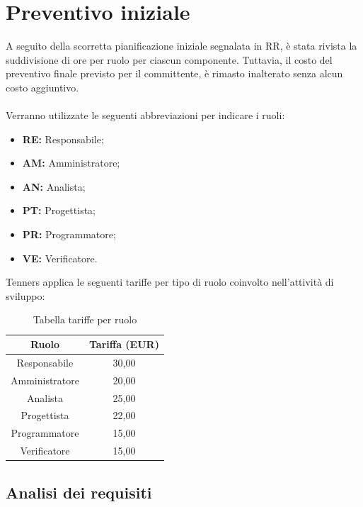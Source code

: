 \section{Preventivo iniziale}
A seguito della scorretta pianificazione iniziale segnalata in RR, è stata rivista la suddivisione di ore per ruolo per ciascun componente. Tuttavia, il costo del preventivo finale previsto per il committente, è rimasto inalterato senza alcun costo aggiuntivo.\\\\
Verranno utilizzate le seguenti abbreviazioni per indicare i ruoli:
\begin{itemize}
	\item \textbf{RE:} Responsabile;
	\item \textbf{AM:} Amministratore;
	\item \textbf{AN:} Analista;
	\item \textbf{PT:} Progettista;
	\item \textbf{PR:} Programmatore;
	\item \textbf{VE:} Verificatore.
\end{itemize}
Tenners applica le seguenti tariffe per tipo di ruolo coinvolto nell'attività di sviluppo:\\
\begin{table}[h]
\caption{Tabella tariffe per ruolo}
\begin{center}
\begin{tabular}{ |c|c|  }
 \hline
 Ruolo 		& Tariffa (EUR)\\
 \hline\hline
	Responsabile	& 30,00\\
	Amministratore	& 20,00\\
	Analista		& 25,00\\
	Progettista		& 22,00\\
	Programmatore	& 15,00\\
	Verificatore	& 15,00\\
 \hline
\end{tabular}
\end{center}
\end{table}
\newpage
\subsection{Analisi dei requisiti}
